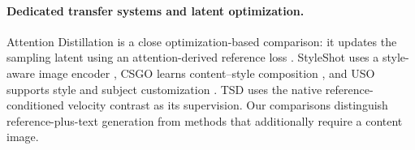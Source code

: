 \paragraph{Dedicated transfer systems and latent optimization.}
Attention Distillation is a close optimization-based comparison: it updates
the sampling latent using an attention-derived reference loss
\citep{zhou2025attentiondistillation}. StyleShot uses a style-aware image
encoder \citep{gao2024styleshot}, CSGO learns content--style composition
\citep{xing2024csgo}, and USO supports style and subject customization
\citep{wu2025uso}. TSD uses the native reference-conditioned velocity
contrast as its supervision. Our comparisons distinguish reference-plus-text
generation from methods that additionally require a content image.

